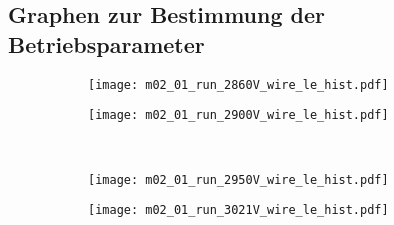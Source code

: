 \documentclass[11pt, ngerman, fleqn, DIV=15, headinclude, BCOR=2cm]{scrreprt}
\begin{document}



\begin{appendix}

	\chapter{Graphen zur Bestimmung der Betriebsparameter}


	\begin{figure}
		\centering
	\begin{subfigure}[a]{0.45 \textwidth}
		\texttt{[image: m02\_01\_run\_2860V\_wire\_le\_hist.pdf]}
		\caption{%
		}
		\label{fig:m02_01_run_2860V_wire_le_hist}
	\end{subfigure}
	\begin{subfigure}[a]{0.45 \textwidth}
		\texttt{[image: m02\_01\_run\_2900V\_wire\_le\_hist.pdf]}
		\caption{%
		}
		\label{fig:m02_01_run_2900V_wire_le_hist}
	\end{subfigure}\\
	\begin{subfigure}[a]{0.45 \textwidth}
		\texttt{[image: m02\_01\_run\_2950V\_wire\_le\_hist.pdf]}
		\caption{%
		}
		\label{fig:m02_01_run_2950V_wire_le_hist}
	\end{subfigure}
	\begin{subfigure}[a]{0.45 \textwidth}
		\texttt{[image: m02\_01\_run\_3021V\_wire\_le\_hist.pdf]}
		\caption{%
		}
		\label{fig:m02_01_run_3021V_wire_le_hist}
	\end{subfigure}
	\caption{%
	}
	\label{fig:m02_01_wire_le_hist}
	\end{figure}



\end{appendix}
\end{document}
